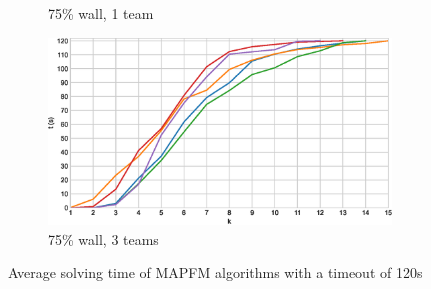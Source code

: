 \documentclass[english]{article}
\newcommand\graphwidth{0.49\textwidth}
\begin{document}
\begin{figure}[b]
\begin{subfigure}{\graphwidth}
			\caption{75\% wall, 1 team}
			\label{fig:r-75-1}
		\end{subfigure}
		\begin{subfigure}{\graphwidth}
			\centering
			\includegraphics[width=\linewidth]{img/results/relative-comparison/75-3}
			\caption{75\% wall, 3 teams}
			\label{fig:r-75-3}
		\end{subfigure}
		\caption{Average solving time of MAPFM algorithms with a timeout of 120s}
		\label{fig:r-times}
	\end{figure}
	
	\restoregeometry
\end{document}
